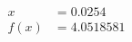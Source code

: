 \documentclass[preview]{standalone}
\begin{document}
\begin{align*}
x &= 0.0254\\f(x) &= 4.0518581
\end{align*}
\end{document}
